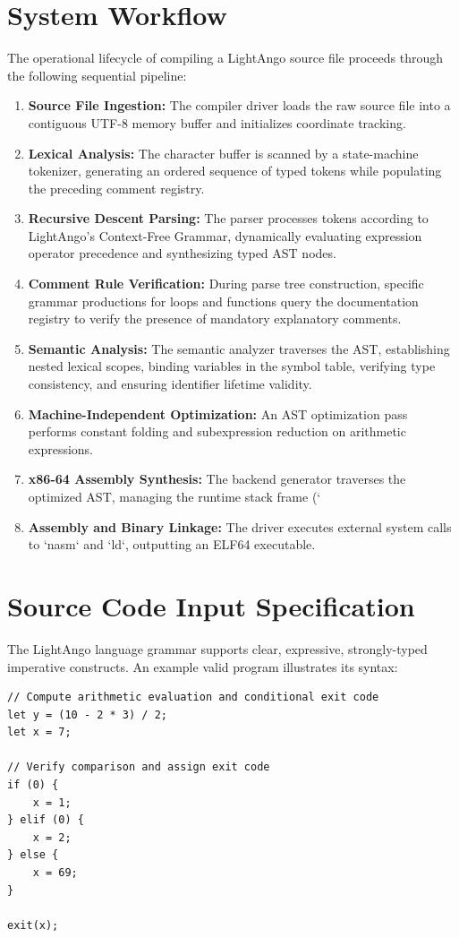 \section{System Workflow}
The operational lifecycle of compiling a LightAngo source file proceeds through the following sequential pipeline:
\begin{enumerate}
    \item \textbf{Source File Ingestion:} The compiler driver loads the raw source file into a contiguous UTF-8 memory buffer and initializes coordinate tracking.
    \item \textbf{Lexical Analysis:} The character buffer is scanned by a state-machine tokenizer, generating an ordered sequence of typed tokens while populating the preceding comment registry.
    \item \textbf{Recursive Descent Parsing:} The parser processes tokens according to LightAngo's Context-Free Grammar, dynamically evaluating expression operator precedence and synthesizing typed AST nodes.
    \item \textbf{Comment Rule Verification:} During parse tree construction, specific grammar productions for loops and functions query the documentation registry to verify the presence of mandatory explanatory comments.
    \item \textbf{Semantic Analysis:} The semantic analyzer traverses the AST, establishing nested lexical scopes, binding variables in the symbol table, verifying type consistency, and ensuring identifier lifetime validity.
    \item \textbf{Machine-Independent Optimization:} An AST optimization pass performs constant folding and subexpression reduction on arithmetic expressions.
    \item \textbf{x86-64 Assembly Synthesis:} The backend generator traverses the optimized AST, managing the runtime stack frame (`%
    \item \textbf{Assembly and Binary Linkage:} The driver executes external system calls to `nasm` and `ld`, outputting an ELF64 executable.
\end{enumerate}

\section{Source Code Input Specification}
The LightAngo language grammar supports clear, expressive, strongly-typed imperative constructs. An example valid program illustrates its syntax:
\begin{verbatim}
// Compute arithmetic evaluation and conditional exit code
let y = (10 - 2 * 3) / 2;
let x = 7;

// Verify comparison and assign exit code
if (0) {
    x = 1;
} elif (0) {
    x = 2;
} else {
    x = 69;
}

exit(x);
\end{verbatim}

